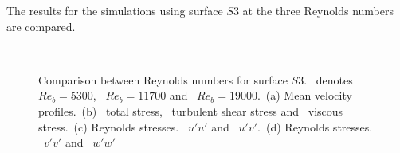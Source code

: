 The results for the simulations using surface $S3$ at the three Reynolds numbers are compared.
\begin{figure}
    \centering
    \begin{subfigure}{0.495\textwidth}
        \centering
        \subcaption{}
        
        \label{subfig: Reynolds comp S3 velocity}
    \end{subfigure}
    \hfill
    \begin{subfigure}{0.495\textwidth}
        \centering
        \subcaption{}
        
        \label{subfig: Reynolds comp S3 total stress}
    \end{subfigure}
    \plotverticalspacing
    \begin{subfigure}{0.495\textwidth}
        \centering
        \subcaption{}
        
        \label{subfig: Reynolds comp S3 Reynolds stresses uu}
    \end{subfigure}
    \hfill
    \begin{subfigure}{0.495\textwidth}
        \centering
        \subcaption{}
        
        \label{subfig: Reynolds comp S3 Reynolds stresses vv}
    \end{subfigure} 
    \\[-10pt]  
    \caption[Comparison of surface $S3$ with different Reynolds numbers]{Comparison between Reynolds numbers for surface $S3$.  \sThreeFiveThreeSymbol\ denotes $Re_b = 5300$, \sThreeElevenSevenSymbol \ $Re_b = 11700$ and \sThreeNineteenSymbol\ $Re_b = 19000$.~(a) Mean velocity profiles.~(b) \lsTotalStressSymbol \ total stress, \lsReynoldsStressSymbol \ turbulent shear stress and \lsDispersiveStressSymbol \ viscous stress.~(c) Reynolds stresses. \lsRuuSymbol \ $u'u'$ and \lsRuvSymbol \ $u'v'$.~(d) Reynolds stresses. \lsRvvSymbol \ $v'v'$ and \lsRwwSymbol \ $w'w'$}
    \label{fig: results Reynolds comparison S3}
\end{figure}


